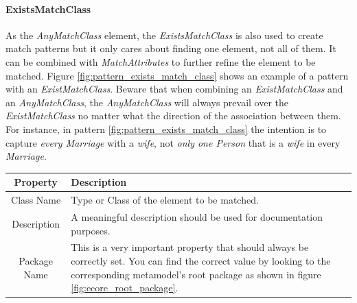 \paragraph{ExistsMatchClass}

As the \emph{AnyMatchClass} element, the \emph{ExistsMatchClass} is also used to
create match patterns but it only cares about finding one element, not all of
them. It can be combined with \emph{MatchAttributes} to further refine the
element to be matched. Figure \ref{fig:pattern_exists_match_class} shows an
example of a pattern with an \emph{ExistMatchClass}. Beware that when combining
an \emph{ExistMatchClass} and an \emph{AnyMatchClass}, the \emph{AnyMatchClass}
will always prevail over the \emph{ExistMatchClass} no matter what the direction
of the association between them. For instance, in pattern
\ref{fig:pattern_exists_match_class} the intention is to capture 
\emph{every Marriage} with a \emph{wife}, not \emph{only one Person} 
that is a \emph{wife} in every \emph{Marriage}.

\begin{center}
  \begin{tabular}{ | c | p{\paragraphsize} | }
    \hline
    \textbf{Property} & \textbf{Description} \\ \hline
    Class Name & Type or Class of the element to be matched.  \\ \hline
    Description & A meaningful description should be used for documentation
  purposes. \\ \hline
    Package Name & This is a very important property that should always be
  correctly set. You can find the
  correct value by looking to the corresponding metamodel's root package as
  shown in figure \ref{fig:ecore_root_package}. \\ \hline
  \end{tabular}
\end{center}

\begin{figure}[h]
\begin{center}
  \caption{}
  \label{fig:match_models_examples_2}
\end{center}
\end{figure}



